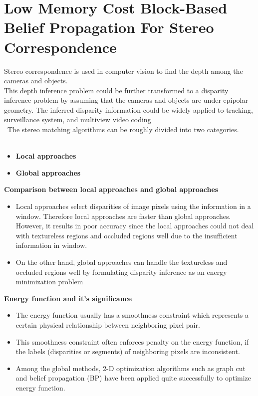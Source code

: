 \section{Low Memory Cost Block-Based Belief Propagation For Stereo Correspondence}

Stereo correspondence is used in computer vision to find the depth among the cameras and objects.\\ This depth inference problem could be further transformed  to  a disparity inference problem by assuming that the cameras and objects are under epipolar geometry. The inferred disparity information could be widely applied to tracking, surveillance system, and multiview video coding \\\
The stereo matching algorithms can be roughly divided into two categories.
\\\
\begin{itemize}
  \item \textbf{Local approaches}
  \item \textbf{Global approaches}
\end{itemize}
\textbf{Comparison between local approaches and global approaches}
\begin{itemize}
  \item Local approaches select disparities of image pixels using the information in a window. Therefore local approaches are faster than global approaches. However, it results in poor accuracy since the local approaches could not deal with textureless regions and occluded regions well due to the insufficient information in window.
  \item On the other hand, global approaches can handle the textureless and occluded regions well by formulating disparity inference as an energy minimization problem
\end{itemize}
\textbf{Energy function and it's significance}
 \begin{itemize}
   \item The energy function usually has a smoothness constraint which represents a certain physical relationship between neighboring pixel pair.
   \item This  smoothness  constraint often enforces penalty on the energy function, if the labels (disparities or segments) of neighboring pixels are inconsistent.
   \item Among the global methods, 2-D optimization algorithms such as graph cut and belief propagation (BP)  have been applied quite successfully to optimize energy function.
\end{itemize}




